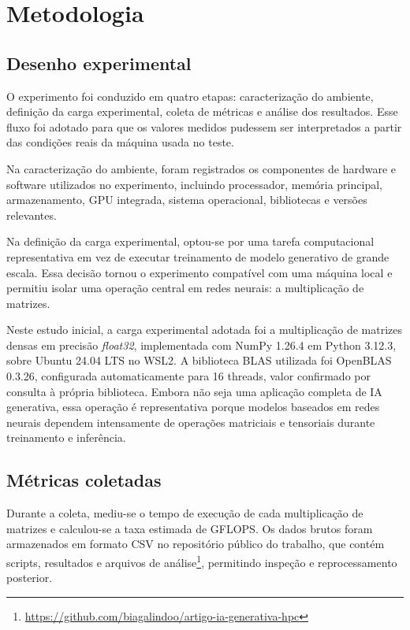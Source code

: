 \section{Metodologia}
\label{sec:metodologia}

\subsection{Desenho experimental}

O experimento foi conduzido em quatro etapas: caracterização do ambiente, definição da carga experimental, coleta de métricas e análise dos resultados. Esse fluxo foi adotado para que os valores medidos pudessem ser interpretados a partir das condições reais da máquina usada no teste.

Na caracterização do ambiente, foram registrados os componentes de hardware e software utilizados no experimento, incluindo processador, memória principal, armazenamento, GPU integrada, sistema operacional, bibliotecas e versões relevantes.

Na definição da carga experimental, optou-se por uma tarefa computacional representativa em vez de executar treinamento de modelo generativo de grande escala. Essa decisão tornou o experimento compatível com uma máquina local e permitiu isolar uma operação central em redes neurais: a multiplicação de matrizes.

Neste estudo inicial, a carga experimental adotada foi a multiplicação de matrizes densas em precisão \textit{float32}, implementada com NumPy 1.26.4 em Python 3.12.3, sobre Ubuntu 24.04 LTS no WSL2. A biblioteca BLAS utilizada foi OpenBLAS 0.3.26, configurada automaticamente para 16 threads, valor confirmado por consulta à própria biblioteca. Embora não seja uma aplicação completa de IA generativa, essa operação é representativa porque modelos baseados em redes neurais dependem intensamente de operações matriciais e tensoriais durante treinamento e inferência.

\subsection{Métricas coletadas}

Durante a coleta, mediu-se o tempo de execução de cada multiplicação de matrizes e calculou-se a taxa estimada de GFLOPS. Os dados brutos foram armazenados em formato CSV no repositório público do trabalho, que contém scripts, resultados e arquivos de análise\footnote{\url{https://github.com/biagalindoo/artigo-ia-generativa-hpc}}, permitindo inspeção e reprocessamento posterior.

